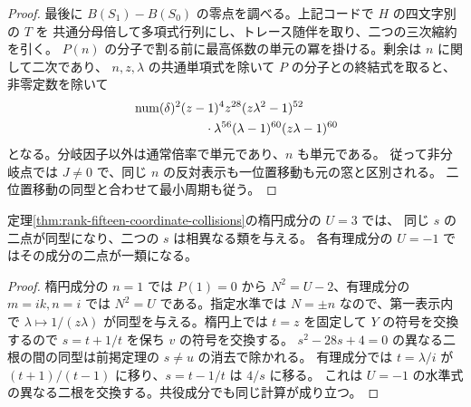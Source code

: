 \begin{proof}
最後に $B(S_1)-B(S_0)$ の零点を調べる。上記コードで $H$ の四文字別の $T$ を
共通分母倍して多項式行列にし、トレース随伴を取り、二つの三次縮約を引く。
$P(n)$ の分子で割る前に最高係数の単元の冪を掛ける。剰余は $n$ に関して二次であり、
$n,z,\lambda$ の共通単項式を除いて $P$ の分子との終結式を取ると、非零定数を除いて
\[
 \begin{aligned}
 &\operatorname{num}(\delta)^2 (z-1)^4 z^{28}
 (z\lambda^2-1)^{52}\\
 &\hspace{20mm}{}\cdot\lambda^{56}(\lambda-1)^{60}(z\lambda-1)^{60}
 \end{aligned}
\]
となる。分岐因子以外は通常倍率で単元であり、$n$ も単元である。
従って非分岐点では $J\ne0$ で、同じ $n$ の反対表示も一位置移動も元の窓と区別される。
二位置移動の同型と合わせて最小周期も従う。
\end{proof}

\begin{corollary}
定理\ref{thm:rank-fifteen-coordinate-collisions}の楕円成分の $U=3$ では、
同じ $s$ の二点が同型になり、二つの $s$ は相異なる類を与える。
各有理成分の $U=-1$ ではその成分の二点が一類になる。
\end{corollary}
\begin{proof}
楕円成分の $n=1$ では $P(1)=0$ から $N^2=U-2$、有理成分の $m=ik,n=i$ では
$N^2=U$ である。指定水準では $N=\pm n$ なので、第一表示内で
$\lambda\mapsto1/(z\lambda)$ が同型を与える。楕円上では $t=z$ を固定して
$Y$ の符号を交換するので $s=t+1/t$ を保ち $v$ の符号を交換する。
$s^2-28s+4=0$ の異なる二根の間の同型は前掲定理の $s\ne u$ の消去で除かれる。
有理成分では $t=\lambda/i$ が $(t+1)/(t-1)$ に移り、$s=t-1/t$ は $4/s$ に移る。
これは $U=-1$ の水準式の異なる二根を交換する。共役成分でも同じ計算が成り立つ。
\end{proof}

